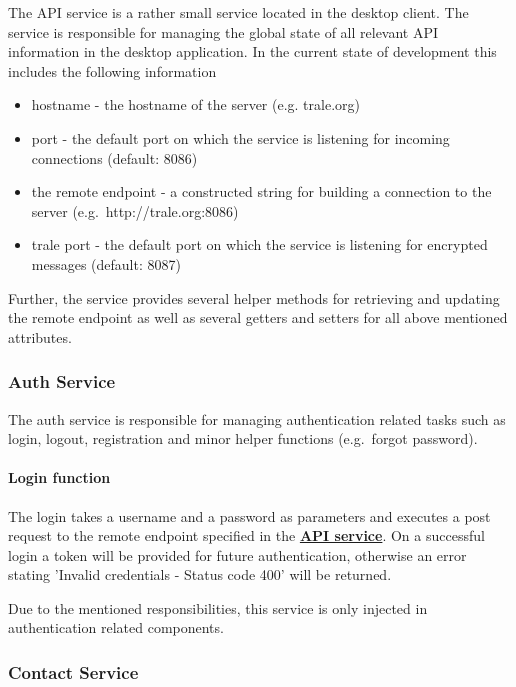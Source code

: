 The API service is a rather small service located in the desktop client.
The service is responsible for managing the global state of all relevant API information in the desktop application.
In the current state of development this includes the following information

\begin{itemize}
    \item hostname - the hostname of the server (e.g. trale.org)
    \item port - the default port on which the service is listening for incoming connections (default: 8086)
    \item the remote endpoint - a constructed string for building a connection to the server (e.g.\ http://trale.org:8086)
    \item trale port - the default port on which the service is listening for encrypted messages (default: 8087)
\end{itemize}

Further, the service provides several helper methods for retrieving and updating the remote endpoint as well as several
getters and setters for all above mentioned attributes.

\subsubsection{Auth Service}\label{subsubsec:auth-service}
The auth service is responsible for managing authentication related tasks such as login, logout, registration and
minor helper functions (e.g.\ forgot password).

\paragraph{Login function}
The login takes a username and a password as parameters and executes a post request to the remote endpoint specified in
the \textbf{\hyperref[subsubsec:api-service]{API service}}.
On a successful login a token will be provided for future authentication, otherwise an error stating 'Invalid
credentials - Status code 400' will be returned.


Due to the mentioned responsibilities, this service is only injected in authentication related components.

\subsubsection{Contact Service}\label{subsubsec:contact-service}

